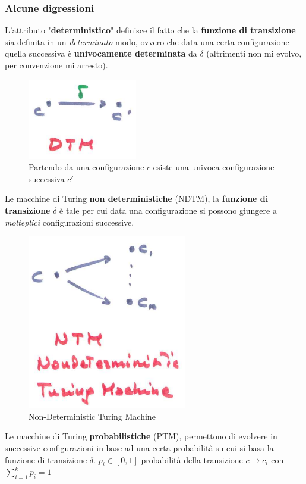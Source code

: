 \documentclass{article}
\begin{document}
\subsubsection{Alcune digressioni}
L'attributo "\textbf{deterministico}" definisce il fatto che la \textbf{funzione di transizione}
sia definita in un \textit{determinato} modo, ovvero che data una certa configurazione quella successiva è
\textbf{univocamente determinata} da $\delta$ (altrimenti non mi evolvo, per convenzione mi arresto).
\begin{figure}[H]
    \centering
    \includegraphics[scale=0.6]{images/dtm_def.png}
    \caption{Partendo da una configurazione $c$ esiste una univoca configurazione
        successiva $c'$}
\end{figure}
Le macchine di Turing \textbf{non deterministiche} (NDTM), la \textbf{funzione di transizione}
$\delta$ è tale per cui data una configurazione si possono giungere a \textit{molteplici} configurazioni
successive.
\begin{figure}[H]
    \centering
    \includegraphics[scale=0.6]{images/NTM.png}
    \caption{Non-Deterministic Turing Machine}
\end{figure}
Le macchine di Turing \textbf{probabilistiche} (PTM), permettono di evolvere
in successive configurazioni in base ad una certa probabilità su cui si basa la funzione
di transizione $\delta$.
$p_i\in[0,1]$ probabilità della transizione $c\rightarrow c_i$ con $\sum_{i=1}^k p_i=1$
\end{document}
